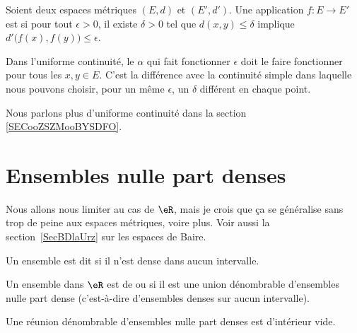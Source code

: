 \begin{definition}\label{DEFooYIPXooQTscbG}
	Soient deux espaces métriques \( (E,d)\) et \( (E',d')\). Une application \( f\colon E\to E'\) est  si pour tout \( \epsilon>0\), il existe \( \delta>0\) tel que \( d(x,y)\leq \delta\) implique \( d'\big( f(x),f(y) \big)\leq \epsilon\).
\end{definition}
Dans l'uniforme continuité, le \( \alpha\) qui fait fonctionner \( \epsilon\) doit le faire fonctionner pour tous les \( x,y\in E\). C'est la différence avec la continuité simple dans laquelle nous pouvons choisir, pour un même \( \epsilon\), un \( \delta\) différent en chaque point.

Nous parlons plus d'uniforme continuité dans la section \ref{SECooZSZMooBYSDFO}.

\section{Ensembles nulle part denses}

Nous allons nous limiter au cas de \( \eR\), mais je crois que ça se généralise sans trop de peine aux espaces métriques, voire plus. Voir aussi la section~\ref{SecBDlaUrz} sur les espaces de Baire.

\begin{definition}
	Un ensemble est dit  si il n'est dense dans aucun intervalle.

	Un ensemble dans \( \eR\) est de  ou  si il est une union dénombrable d'ensembles nulle part dense (c'est-à-dire d'ensembles denses sur aucun intervalle).
\end{definition}

\begin{theorem}      \label{ThoQGalIO}
	Une réunion dénombrable d'ensembles nulle part denses est d'intérieur vide.
\end{theorem}


